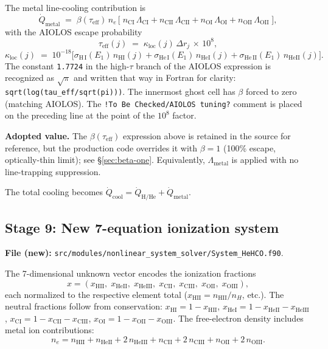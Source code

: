 \documentclass[english,a4paper]{kiseon_memo}
\begin{document}
The metal line-cooling contribution is
\begin{equation}
\dot{Q}_{\mathrm{metal}} \;=\;
\beta(\tau_\mathrm{eff})\, n_{e}\,
\bigl[\;
n_\mathrm{CI}\,\Lambda_\mathrm{CI}
+ n_\mathrm{CII}\,\Lambda_\mathrm{CII}
+ n_\mathrm{OI}\,\Lambda_\mathrm{OI}
+ n_\mathrm{OII}\,\Lambda_\mathrm{OII}
\;\bigr],
\end{equation}
with the AIOLOS escape probability
\[
  \tau_\mathrm{eff}(j) \;=\; \kappa_{\mathrm{loc}}(j)\,\Delta r_j\,\times\,10^{8},
\]
\[
  \kappa_{\mathrm{loc}}(j) \;=\; 10^{-18}\bigl[
  \sigma_{\mathrm{H\,I}}(E_1)\,n_\mathrm{HI}(j) +
  \sigma_{\mathrm{He\,I}}(E_1)\,n_\mathrm{HeI}(j) +
  \sigma_{\mathrm{He\,II}}(E_1)\,n_\mathrm{HeII}(j)\bigr].
\]
The constant \texttt{1.7724} in the high-\(\tau\) branch of
the AIOLOS expression is recognized as
\(\sqrt{\pi}\) and written that way in Fortran for clarity:
\verb|sqrt(log(tau_eff/sqrt(pi)))|.  The innermost ghost
cell has \(\beta\) forced to zero (matching AIOLOS).  The
\texttt{!To Be Checked/AIOLOS tuning?} comment is placed on the
preceding line at the point of the \(10^{8}\) factor.

\textbf{Adopted value.}  The \(\beta(\tau_\mathrm{eff})\) expression
above is retained in the source for reference, but the production code
overrides it with \(\beta = 1\) (100\% escape, optically-thin limit);
see \S\ref{sec:beta-one}.  Equivalently, \(\Lambda_\mathrm{metal}\) is
applied with no line-trapping suppression.

The total cooling becomes
\(\dot{Q}_{\mathrm{cool}} = \dot{Q}_{\mathrm{H/He}} + \dot{Q}_{\mathrm{metal}}\).

\subsection{Stage 9: New 7-equation ionization system}
\textbf{File (new):} \texttt{src/modules/nonlinear\_system\_solver/System\_HeHCO.f90}.

The 7-dimensional unknown vector encodes the ionization fractions
\[
  x = (x_\mathrm{HII},\; x_\mathrm{HeII},\; x_\mathrm{HeIII},\;
       x_\mathrm{CII},\; x_\mathrm{CIII},\; x_\mathrm{OII},\; x_\mathrm{OIII}),
\]
each normalized to the respective element total
(\(x_\mathrm{HII} = n_\mathrm{HII}/n_H\), etc.).  The neutral fractions
follow from conservation:
\(x_\mathrm{HI} = 1 - x_\mathrm{HII}\),
\(x_\mathrm{HeI} = 1 - x_\mathrm{HeII} - x_\mathrm{HeIII}\),
\(x_\mathrm{CI} = 1 - x_\mathrm{CII} - x_\mathrm{CIII}\),
\(x_\mathrm{OI} = 1 - x_\mathrm{OII} - x_\mathrm{OIII}\).
The free-electron density includes metal ion contributions:
\[
  n_e = n_\mathrm{HII} + n_\mathrm{HeII} + 2\,n_\mathrm{HeIII}
      + n_\mathrm{CII} + 2\,n_\mathrm{CIII}
      + n_\mathrm{OII} + 2\,n_\mathrm{OIII}.
\]
\end{document}
